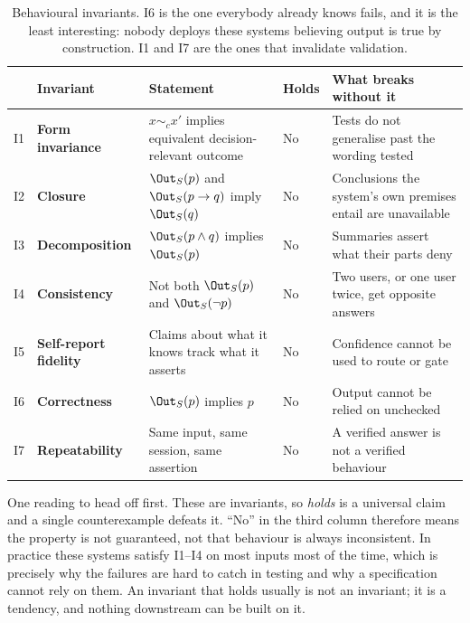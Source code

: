 \begin{table}[ht]
  \centering
  \small
  \begin{tabular}{@{}>{\raggedright\arraybackslash}p{0.5cm}>{\raggedright\arraybackslash}p{2.9cm}>{\raggedright\arraybackslash}p{4.1cm}>{\raggedright\arraybackslash}p{1.1cm}>{\raggedright\arraybackslash}p{4.4cm}@{}}
    \toprule
    & Invariant & Statement & Holds & What breaks without it \\
    \midrule
    I1 & \textbf{Form invariance}
       & $x \sim_c x'$ implies equivalent decision-relevant outcome
       & No
       & Tests do not generalise past the wording tested \\
    \addlinespace
    I2 & \textbf{Closure}
       & $\Out_S(p)$ and $\Out_S(p \rightarrow q)$ imply $\Out_S(q)$
       & No
       & Conclusions the system's own premises entail are unavailable \\
    \addlinespace
    I3 & \textbf{Decomposition}
       & $\Out_S(p \wedge q)$ implies $\Out_S(p)$
       & No
       & Summaries assert what their parts deny \\
    \addlinespace
    I4 & \textbf{Consistency}
       & Not both $\Out_S(p)$ and $\Out_S(\neg p)$
       & No
       & Two users, or one user twice, get opposite answers \\
    \addlinespace
    I5 & \textbf{Self-report fidelity}
       & Claims about what it knows track what it asserts
       & No
       & Confidence cannot be used to route or gate \\
    \addlinespace
    I6 & \textbf{Correctness}
       & $\Out_S(p)$ implies $p$
       & No
       & Output cannot be relied on unchecked \\
    \addlinespace
    I7 & \textbf{Repeatability}
       & Same input, same session, same assertion
       & No
       & A verified answer is not a verified behaviour \\
    \bottomrule
  \end{tabular}
  \caption{Behavioural invariants. I6 is the one everybody already knows fails, and
    it is the least interesting: nobody deploys these systems believing output is
    true by construction. I1 and I7 are the ones that invalidate validation.}
  \label{tab:invariants-behaviour}
\end{table}

One reading to head off first. These are invariants, so \emph{holds} is a universal
claim and a single counterexample defeats it. ``No'' in the third column therefore
means the property is not guaranteed, not that behaviour is always inconsistent. In
practice these systems satisfy I1--I4 on most inputs most of the time, which is
precisely why the failures are hard to catch in testing and why a specification cannot
rely on them. An invariant that holds usually is not an invariant; it is a tendency,
and nothing downstream can be built on it.

